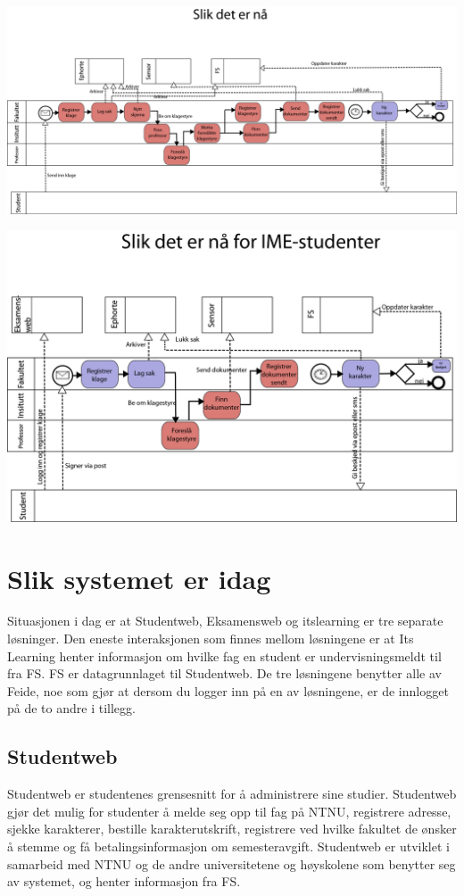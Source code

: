 \documentclass[12pt]{article}
\begin{document}
\includegraphics[width=0.9 \textwidth]{before.png}

\includegraphics[width=0.9 \textwidth]{eksamensweb_ny.png}

\section{Slik systemet er idag}
Situasjonen i dag er at Studentweb, Eksamensweb og itslearning er tre separate løsninger.  Den eneste interaksjonen som finnes mellom løsningene er at Its Learning henter informasjon om hvilke fag en student er undervisningsmeldt til fra FS. FS er datagrunnlaget til Studentweb. De tre løsningene benytter alle av Feide, noe som gjør at dersom du logger inn på en av løsningene, er de innlogget på de to andre i tillegg. 

\subsection{Studentweb}

Studentweb er studentenes grensesnitt for å administrere sine studier. Studentweb gjør det mulig for studenter å melde seg opp til fag på NTNU, registrere adresse, sjekke karakterer, bestille karakterutskrift, registrere ved hvilke fakultet de ønsker å stemme og få betalingsinformasjon om semesteravgift. Studentweb er utviklet i samarbeid med NTNU og de andre universitetene og høyskolene som benytter seg av systemet, og henter informasjon fra FS. 
\end{document}
